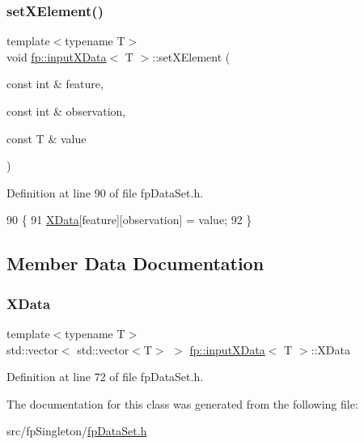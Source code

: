 \subsubsection{\texorpdfstring{set\+X\+Element()}{setXElement()}}
{\footnotesize\ttfamily template$<$typename T$>$ \\
void \hyperlink{classfp_1_1inputXData}{fp\+::input\+X\+Data}$<$ T $>$\+::set\+X\+Element (\begin{DoxyParamCaption}\item[{const int \&}]{feature,  }\item[{const int \&}]{observation,  }\item[{const T \&}]{value }\end{DoxyParamCaption})\hspace{0.3cm}{\ttfamily [inline]}}



Definition at line 90 of file fp\+Data\+Set.\+h.


\begin{DoxyCode}
90                                                                                             \{
91             \hyperlink{classfp_1_1inputXData_ad08f8c44df38fb88799cda53cc50eaa5}{XData}[feature][observation] = value;
92         \}
\end{DoxyCode}


\subsection{Member Data Documentation}
\mbox{\label{classfp_1_1inputXData_ad08f8c44df38fb88799cda53cc50eaa5}} 
\subsubsection{\texorpdfstring{X\+Data}{XData}}
{\footnotesize\ttfamily template$<$typename T$>$ \\
std\+::vector$<$ std\+::vector$<$T$>$ $>$ \hyperlink{classfp_1_1inputXData}{fp\+::input\+X\+Data}$<$ T $>$\+::X\+Data\hspace{0.3cm}{\ttfamily [private]}}



Definition at line 72 of file fp\+Data\+Set.\+h.



The documentation for this class was generated from the following file\+:\begin{DoxyCompactItemize}
\item 
src/fp\+Singleton/\hyperlink{fpDataSet_8h}{fp\+Data\+Set.\+h}\end{DoxyCompactItemize}
